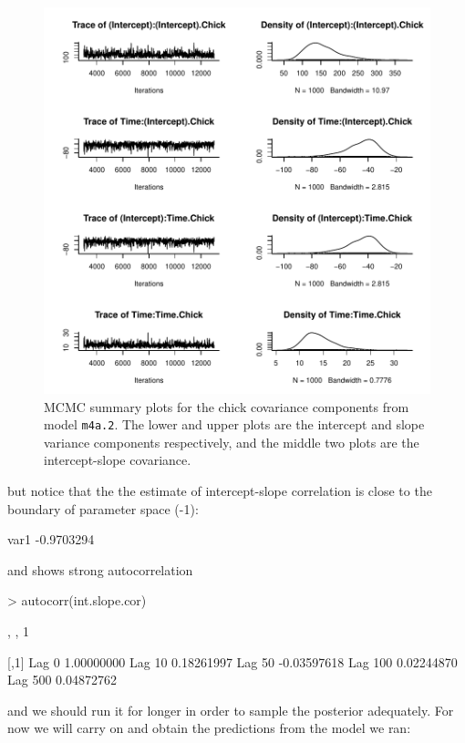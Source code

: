 \documentclass{article}
\begin{document}
\begin{figure}[!h]
\begin{center}
\includegraphics{Lecture4-017}
\end{center}
\caption{MCMC summary plots for the chick covariance components from model \texttt{m4a.2}. The lower and upper plots are the intercept and slope variance components respectively, and the middle two plots are the intercept-slope covariance.}
\label{RR2VCV-fig}
\end{figure}

but notice that the the estimate of intercept-slope correlation is close to the boundary of parameter space (-1):

\begin{Schunk}
\begin{Soutput}
      var1 
-0.9703294 
\end{Soutput}
\end{Schunk}

and shows strong autocorrelation

\begin{Schunk}
\begin{Sinput}
> autocorr(int.slope.cor)
\end{Sinput}
\begin{Soutput}
, , 1

               [,1]
Lag 0    1.00000000
Lag 10   0.18261997
Lag 50  -0.03597618
Lag 100  0.02244870
Lag 500  0.04872762
\end{Soutput}
\end{Schunk}
and we should run it for longer in order to sample the posterior adequately. For now we will carry on and obtain the predictions from the model we ran:
\end{document}
